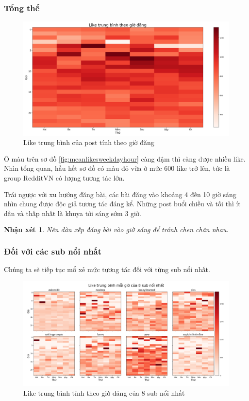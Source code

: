 \documentclass[10pt,a4paper]{article}
\newtheorem{remark}{Nhận xét}
\begin{document}
\subsubsection{Tổng thể}
\begin{figure}[!h]
    \centering
    \includegraphics[width=\textwidth]{img/MeanLikesWeekdayHour.png}
    \caption{Like trung bình của post tính theo giờ đăng}
    \label{fig:meanlikesweekdayhour}
\end{figure}

Ô màu trên sơ đồ \eqref{fig:meanlikesweekdayhour} càng đậm thì càng được nhiều like. Nhìn tổng quan, hầu hết sơ đồ có màu đỏ vừa ở mức 600 like trở lên, tức là group RedditVN có lượng tương tác lớn.

Trái ngược với xu hướng đăng bài, các bài đăng vào khoảng 4 đến 10 giờ sáng nhìn chung được độc giả tương tác đáng kể. Những post buổi chiều và tối thì ít dần và thấp nhất là khuya tới sáng sớm 3 giờ.

\begin{remark}
    \label{re:time}
    Nên dàn xếp đăng bài vào giờ sáng để tránh chen chân nhau.
\end{remark}
\subsubsection{Đối với các sub nổi nhất}
Chúng ta sẽ tiếp tục mổ xẻ mức tương tác đối với từng sub nổi nhất.
\begin{figure}[!h]
    \centering
    \includegraphics[width=\textwidth]{img/MeanLikesWeekdayHourPerSub.png}
    \caption{Like trung bình tính theo giờ đăng của 8 sub nổi nhất}
    \label{fig:meanlikesweekdayhourpersub}
\end{figure}
\end{document}
